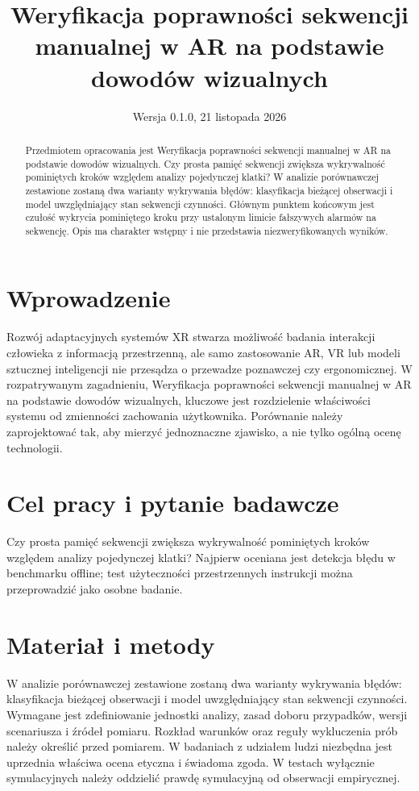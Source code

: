 \documentclass[11pt,a4paper]{article}
\title{Weryfikacja poprawności sekwencji manualnej w AR na podstawie dowodów wizualnych}
\author{}
\date{Wersja 0.1.0, 21 listopada 2026}
\begin{document}
\maketitle

\begin{abstract}

Przedmiotem opracowania jest Weryfikacja poprawności sekwencji manualnej w AR na podstawie dowodów wizualnych. Czy prosta pamięć sekwencji zwiększa wykrywalność pominiętych kroków względem analizy pojedynczej klatki? W analizie porównawczej zestawione zostaną dwa warianty wykrywania błędów: klasyfikacja bieżącej obserwacji i model uwzględniający stan sekwencji czynności. Głównym punktem końcowym jest czułość wykrycia pominiętego kroku przy ustalonym limicie fałszywych alarmów na sekwencję. Opis ma charakter wstępny i nie przedstawia niezweryfikowanych wyników.

\end{abstract}

\section{Wprowadzenie}

Rozwój adaptacyjnych systemów XR stwarza możliwość badania interakcji człowieka z informacją przestrzenną, ale samo zastosowanie AR, VR lub modeli sztucznej inteligencji nie przesądza o przewadze poznawczej czy ergonomicznej. W rozpatrywanym zagadnieniu, Weryfikacja poprawności sekwencji manualnej w AR na podstawie dowodów wizualnych, kluczowe jest rozdzielenie właściwości systemu od zmienności zachowania użytkownika. Porównanie należy zaprojektować tak, aby mierzyć jednoznaczne zjawisko, a nie tylko ogólną ocenę technologii.

\section{Cel pracy i pytanie badawcze}

Czy prosta pamięć sekwencji zwiększa wykrywalność pominiętych kroków względem analizy pojedynczej klatki? Najpierw oceniana jest detekcja błędu w benchmarku offline; test użyteczności przestrzennych instrukcji można przeprowadzić jako osobne badanie.

\section{Materiał i metody}

W analizie porównawczej zestawione zostaną dwa warianty wykrywania błędów: klasyfikacja bieżącej obserwacji i model uwzględniający stan sekwencji czynności. Wymagane jest zdefiniowanie jednostki analizy, zasad doboru przypadków, wersji scenariusza i źródeł pomiaru. Rozkład warunków oraz reguły wykluczenia prób należy określić przed pomiarem. W badaniach z udziałem ludzi niezbędna jest uprzednia właściwa ocena etyczna i świadoma zgoda. W testach wyłącznie symulacyjnych należy oddzielić prawdę symulacyjną od obserwacji empirycznej.
\end{document}
